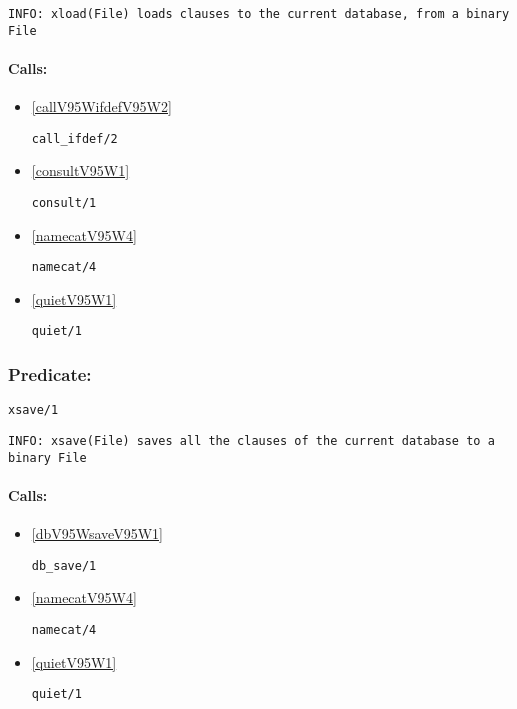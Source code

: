 {\small \begin{verbatim}
INFO: xload(File) loads clauses to the current database, from a binary File

\end{verbatim}}
\paragraph{Calls:} 
\begin{itemize}
\item \ref{callV95WifdefV95W2} 
\begin{verbatim}
call_ifdef/2
\end{verbatim}

\item \ref{consultV95W1} 
\begin{verbatim}
consult/1
\end{verbatim}

\item \ref{namecatV95W4} 
\begin{verbatim}
namecat/4
\end{verbatim}

\item \ref{quietV95W1} 
\begin{verbatim}
quiet/1
\end{verbatim}

\end{itemize}

\subsubsection{Predicate:} \label{xsaveV95W1}

\begin{verbatim}
xsave/1
\end{verbatim}

{\small \begin{verbatim}
INFO: xsave(File) saves all the clauses of the current database to a binary File

\end{verbatim}}
\paragraph{Calls:} 
\begin{itemize}
\item \ref{dbV95WsaveV95W1} 
\begin{verbatim}
db_save/1
\end{verbatim}

\item \ref{namecatV95W4} 
\begin{verbatim}
namecat/4
\end{verbatim}

\item \ref{quietV95W1} 
\begin{verbatim}
quiet/1
\end{verbatim}

\end{itemize}

